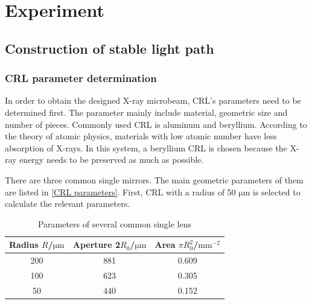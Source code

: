 \documentclass{Head}
\begin{document}
\section{Experiment}
\subsection{Construction of stable light path}
\subsubsection{CRL parameter determination}
In order to obtain the designed X-ray microbeam, CRL's parameters need to be determined first.
The parameter mainly include material, geometric size and number of pieces.
Commonly used CRL is aluminum and beryllium.
According to the theory of atomic physics, materials with low atomic number have less absorption of X-rays. In this system, a beryllium CRL is chosen because the X-ray energy needs to be preserved as much as possible.



There are three common single mirrors.
The main geometric parameters of them are listed in \autoref{CRL parameters}.
First, CRL with a radius of 50 $\mathrm{\mu m}$ is selected to calculate the relevant parameters.
\begin{table}
    \centering
    \caption{Parameters of several common single lens}
    \begin{tabular}{ccc}
        \toprule
        Radius $R$/$\mathrm{\mu m}$ & Aperture 2$R_0$/$\mathrm{\mu m}$ & Area $\pi R_0^2$/$\mathrm{mm^{-2}}$ \\
        \midrule
        200                         & 881                              & 0.609                               \\
        100                         & 623                              & 0.305                               \\
        50                          & 440                              & 0.152                               \\
        \bottomrule
    \end{tabular}
    \label{CRL parameters}
\end{table}
\end{document}
